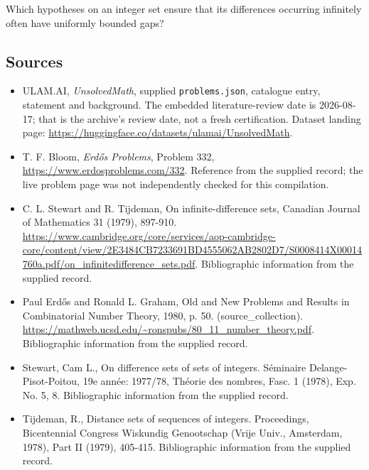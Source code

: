 \documentclass[11pt,a4paper]{article}
\begin{document}
Which hypotheses on an integer set ensure that its differences occurring infinitely often have uniformly bounded gaps?

\subsection{Sources}

{\small

\begin{itemize}

\item[\hypertarget{source:statement:1}{S1}] ULAM.AI, \emph{UnsolvedMath}, supplied \texttt{problems.json}, catalogue entry, statement and background. The embedded literature-review date is 2026-08-17; that is the archive’s review date, not a fresh certification. Dataset landing page: \url{https://huggingface.co/datasets/ulamai/UnsolvedMath}.

\item[\hypertarget{source:statement:2}{S2}] T. F. Bloom, \emph{Erdős Problems}, Problem 332, \url{https://www.erdosproblems.com/332}. Reference from the supplied record; the live problem page was not independently checked for this compilation.

\item[\hypertarget{source:statement:3}{S3}] C. L. Stewart and R. Tijdeman, On infinite-difference sets, Canadian Journal of Mathematics 31 (1979), 897-910. \url{https://www.cambridge.org/core/services/aop-cambridge-core/content/view/2E3484CB7233691BD4555062AB2802D7/S0008414X00014760a.pdf/on_infinitedifference_sets.pdf}. Bibliographic information from the supplied record.

\item[\hypertarget{source:statement:4}{S4}] Paul Erdős and Ronald L. Graham, Old and New Problems and Results in Combinatorial Number Theory, 1980, p. 50. (source\_collection). \url{https://mathweb.ucsd.edu/~ronspubs/80_11_number_theory.pdf}. Bibliographic information from the supplied record.

\item[\hypertarget{source:statement:5}{S5}] Stewart, Cam L., On difference sets of sets of integers. S\'{e}minaire Delange-Pisot-Poitou, 19e ann\'{e}e: 1977/78, Th\'{e}orie des nombres, Fasc. 1 (1978), Exp. No. 5, 8. Bibliographic information from the supplied record.

\item[\hypertarget{source:statement:6}{S6}] Tijdeman, R., Distance sets of sequences of integers. Proceedings, Bicentennial Congress Wiskundig Genootschap (Vrije Univ., Amsterdam, 1978), Part II (1979), 405-415. Bibliographic information from the supplied record.

\end{itemize}

}

\label{end:statement}
\end{document}
